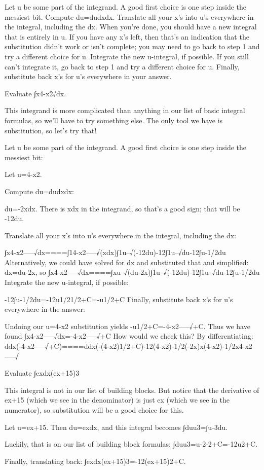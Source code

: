Let u be some part of the integrand. A good first choice is one step inside the messiest bit.
Compute du=dudxdx.
Translate all your x's into u's everywhere in the integral, including the dx. When you're done, you should have a new integral that is entirely in u. If you have any x's left, then that's an indication that the substitution didn't work or isn't complete; you may need to go back to step 1 and try a different choice for u.
Integrate the new u-integral, if possible. If you still can't integrate it, go back to step 1 and try a different choice for u.
Finally, substitute back x's for u's everywhere in your answer.
\begin{example}
Evaluate ∫x4-x2√dx.

\begin{solution}
  This integrand is more complicated than anything in our list of basic integral formulas, so we'll have to try something else. The only tool we have is substitution, so let's try that!

Let u be some part of the integrand. A good first choice is one step inside the messiest bit:

Let u=4-x2.

Compute du=dudxdx:

du=-2xdx. There is xdx in the integrand, so that’s a good sign; that will be -12du.

Translate all your x's into u's everywhere in the integral, including the dx:

∫x4-x2-----√dx====∫14-x2-----√(xdx)∫1u--√(-12du)-12∫1u--√du-12∫u-1/2du
Alternatively, we could have solved for dx and substituted that and simplified: dx=du-2x, so
∫x4-x2-----√dx====∫xu--√(du-2x)∫1u--√(-12du)-12∫1u--√du-12∫u-1/2du
Integrate the new u-integral, if possible:

-12∫u-1/2du=-12u1/21/2+C=-u1/2+C
Finally, substitute back x's for u's everywhere in the answer:

Undoing our u=4-x2 substitution yields
-u1/2+C=-4-x2-----√+C.
Thus we have found
∫x4-x2-----√dx=-4-x2-----√+C
How would we check this? By differentiating:
ddx(-4-x2-----√+C)====ddx(-(4-x2)1/2+C)-12(4-x2)-1/2(-2x)x(4-x2)-1/2x4-x2-----√
\end{solution}\end{example}

\begin{example}
Evaluate ∫exdx(ex+15)3

\begin{solution}
This integral is not in our list of building blocks. But notice that the derivative of ex+15 (which we see in the denominator) is just ex (which we see in the numerator), so substitution will be a good choice for this.

Let u=ex+15. Then du=exdx, and this integral becomes ∫duu3=∫u-3du.

Luckily, that is on our list of building block formulas: ∫duu3=u-2-2+C=-12u2+C.

Finally, translating back:
∫exdx(ex+15)3=-12(ex+15)2+C.
\end{solution}\end{example}

